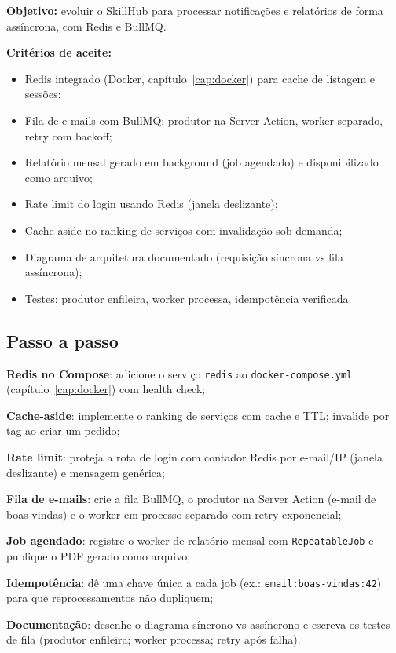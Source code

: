 \begin{caixaprojeto}
\textbf{Objetivo:} evoluir o SkillHub para processar notificações e
relatórios de forma assíncrona, com Redis e BullMQ.

\textbf{Critérios de aceite:}
\begin{itemize}[leftmargin=*, itemsep=0.2em]
  \item Redis integrado (Docker, capítulo~\ref{cap:docker}) para cache de listagem e sessões;
  \item Fila de e-mails com BullMQ: produtor na Server Action, worker separado, retry com backoff;
  \item Relatório mensal gerado em background (job agendado) e disponibilizado como arquivo;
  \item Rate limit do login usando Redis (janela deslizante);
  \item Cache-aside no ranking de serviços com invalidação sob demanda;
  \item Diagrama de arquitetura documentado (requisição síncrona vs fila assíncrona);
  \item Testes: produtor enfileira, worker processa, idempotência verificada.
\end{itemize}
\end{caixaprojeto}

\subsection{Passo a passo}

\begin{passos}
  \item \textbf{Redis no Compose}: adicione o serviço \texttt{redis} ao
  \texttt{docker-compose.yml} (capítulo~\ref{cap:docker}) com health check;
  \item \textbf{Cache-aside}: implemente o ranking de serviços com cache e
  TTL; invalide por tag ao criar um pedido;
  \item \textbf{Rate limit}: proteja a rota de login com contador Redis por
  e-mail/IP (janela deslizante) e mensagem genérica;
  \item \textbf{Fila de e-mails}: crie a fila BullMQ, o produtor na Server
  Action (e-mail de boas-vindas) e o worker em processo separado com retry
  exponencial;
  \item \textbf{Job agendado}: registre o worker de relatório mensal com
  \texttt{RepeatableJob} e publique o PDF gerado como arquivo;
  \item \textbf{Idempotência}: dê uma chave única a cada job (ex.:
  \texttt{email:boas-vindas:42}) para que reprocessamentos não dupliquem;
  \item \textbf{Documentação}: desenhe o diagrama síncrono vs assíncrono e
  escreva os testes de fila (produtor enfileira; worker processa; retry após
  falha).
\end{passos}

